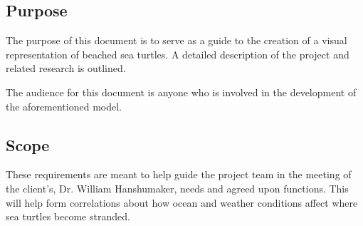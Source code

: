 \documentclass[onecolumn, draftclsnofoot,10pt, compsoc]{IEEEtran}
\begin{document}
\begin{singlespace}
\subsection{Purpose}
The purpose of this document is to serve as a guide to the creation of a visual representation of beached sea turtles. A detailed description of the project and related research is outlined. \newline 
\par \noindent The audience for this document is anyone who is involved in the development of the aforementioned model.
\subsection{Scope}
    These requirements are meant to help guide the project team in the meeting of the client's, Dr. William Hanshumaker, needs and agreed upon functions.  This will help form correlations about how ocean and weather conditions affect where sea turtles become stranded.

\end{singlespace}
\end{document}
